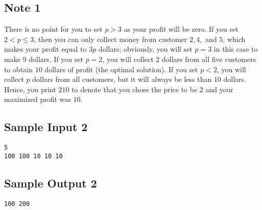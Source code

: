 \documentclass[12pt]{article}
\begin{document}
\subsection*{Note 1}
There is no point for you to set $p > 3$ as your profit will be zero. If you set $2 < p \leq 3$, then you can only collect money from customer $2, 4,$ and $5$, which makes your profit equal to $3p$ dollars; obviously, you will set $p = 3$ in this case to make $9$ dollars. 
If you set $p = 2$, you will collect $2$ dollars from all five customers to obtain $10$ dollars of profit (the optimal solution).
If you set $p < 2$, you will collect $p$ dollars from all customers, but it will always be less than $10$ dollars. 
Hence, you print $2 10$ to denote that you chose the price to be $2$ and your maximized profit was $10$. 

\subsection*{Sample Input 2}
\begin{verbatim}
5
100 100 10 10 10
\end{verbatim}
\subsection*{Sample Output 2}
\begin{verbatim}
100 200
\end{verbatim}
\end{document}
